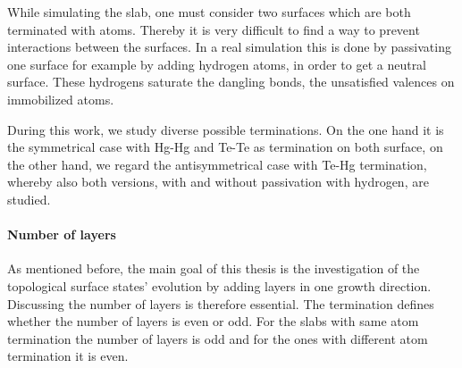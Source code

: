 %		
		
		While simulating the slab, one must consider two surfaces which are both terminated with atoms. Thereby it is very difficult to find a way to prevent interactions between the surfaces. In a real simulation this is done by passivating one surface for example by adding hydrogen atoms, in order to get a neutral surface. These hydrogens saturate the dangling bonds, the unsatisfied valences on immobilized atoms.
		
		During this work, we study diverse possible terminations. On the one hand it is the symmetrical case with Hg-Hg and Te-Te as termination on both surface, on the other hand, we regard the antisymmetrical case with Te-Hg termination, whereby also both versions, with and without passivation with hydrogen, are studied. 
	\paragraph{Number of layers}
		As mentioned before, the main goal of this thesis is the investigation of the topological surface states' evolution by adding layers in one growth direction. Discussing the number of layers is therefore essential. The termination defines whether the number of layers is even or odd. For the slabs with same atom termination the number of layers is odd and for the ones with different atom termination it is even. 
		
